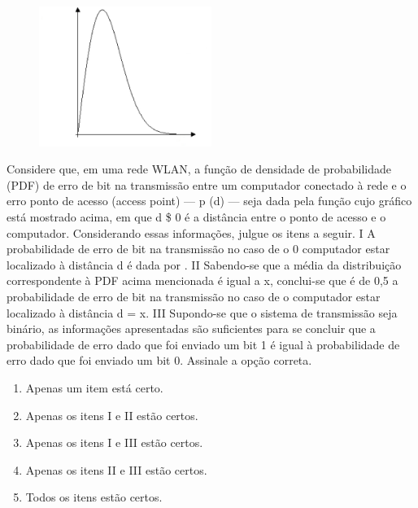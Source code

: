 \documentclass{exam}
\begin{document}
\begin{questions}
\begin{figure}[H]
	\begin{center}
		\includegraphics[width=0.5\textwidth]{CIENCIA_DA_COMPUTACAO_Prova2005-utf8_figuras/fig-0043.jpg}
	\end{center}
\end{figure}
Considere que, em uma rede WLAN, a função de
densidade de probabilidade (PDF) de erro de bit na
transmissão entre um computador conectado à rede e o
erro
ponto de acesso (access point) — p (d) — seja dada
pela função cujo gráfico está mostrado acima, em que d
\$ 0 é a distância entre o ponto de acesso e o
computador.
Considerando essas informações, julgue os itens a seguir.
I A probabilidade de erro de bit na transmissão no caso de o
0
computador estar localizado à distância d é dada
por .
II Sabendo-se que a média da distribuição correspondente
à PDF acima mencionada é igual a x, conclui-se que é de
0,5 a probabilidade de erro de bit na transmissão no caso
de o computador estar localizado à distância d = x.
III Supondo-se que o sistema de transmissão seja binário, as
informações apresentadas são suficientes para se
concluir que a probabilidade de erro dado que foi enviado
um bit 1 é igual à probabilidade de erro dado que foi
enviado um bit 0.
Assinale a opção correta.
	\begin{enumerate}[label=\alph*)]
		\item  Apenas um item está certo.
		\item  Apenas os itens I e II estão certos.
		\item  Apenas os itens I e III estão certos.
		\item  Apenas os itens II e III estão certos.
		\item  Todos os itens estão certos.
	\end{enumerate}


\end{questions}
\end{document}
